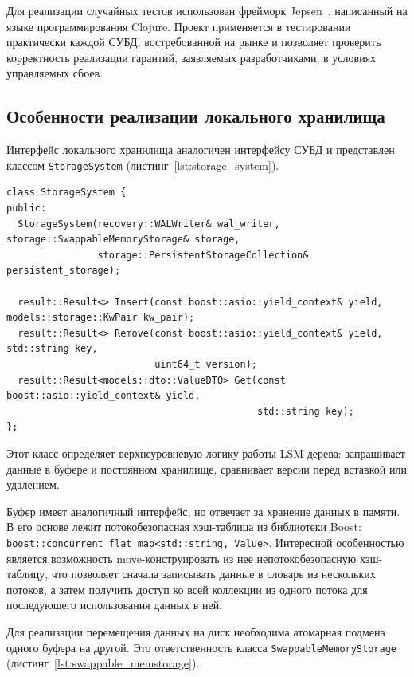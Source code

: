 \documentclass[14pt, russian]{scrartcl}
\newcommand{\refAlgo}[1]{(листинг~\ref{#1})}
\begin{document}
Для реализации случайных тестов использован фрейморк Jepsen~\cite{jepsen},
написанный на языке программирования Clojure. Проект применяется в тестировании
практически каждой СУБД, востребованной на рынке и позволяет проверить
корректность реализации гарантий, заявляемых разработчиками, в условиях
управляемых сбоев.

\subsection{Особенности реализации локального хранилища}

Интерфейс локального хранилища аналогичен интерфейсу СУБД и представлен классом
\verb|StorageSystem| \refAlgo{lst:storage_system}.

\begin{listing}
  \caption{Объявление класса StorageSystem.}
  \label{lst:storage_system}
  \begin{verbatim}
class StorageSystem {
public:
  StorageSystem(recovery::WALWriter& wal_writer, storage::SwappableMemoryStorage& storage,
                storage::PersistentStorageCollection& persistent_storage);

  result::Result<> Insert(const boost::asio::yield_context& yield, models::storage::KwPair kw_pair);
  result::Result<> Remove(const boost::asio::yield_context& yield, std::string key,
                          uint64_t version);
  result::Result<models::dto::ValueDTO> Get(const boost::asio::yield_context& yield,
                                            std::string key);
};
  \end{verbatim}
\end{listing}

Этот класс определяет верхнеуровневую логику работы LSM-дерева: запрашивает
данные в буфере и постоянном хранилище, сравнивает версии перед вставкой или
удалением.

Буфер имеет аналогичный интерфейс, но отвечает за хранение данных в памяти. В
его основе лежит потокобезопасная хэш-таблица из библиотеки Boost:
\verb|boost::concurrent_flat_map<std::string, Value>|. Интересной особенностью
является возможность move-конструировать из нее непотокобезопасную хэш-таблицу,
что позволяет сначала записывать данные в словарь из нескольких потоков, а затем
получить доступ ко всей коллекции из одного потока для последующего
использования данных в ней.

Для реализации перемещения данных на диск необходима атомарная подмена одного
буфера на другой. Это ответственность класса \verb|SwappableMemoryStorage|
\refAlgo{lst:swappable_memstorage}.
\end{document}
